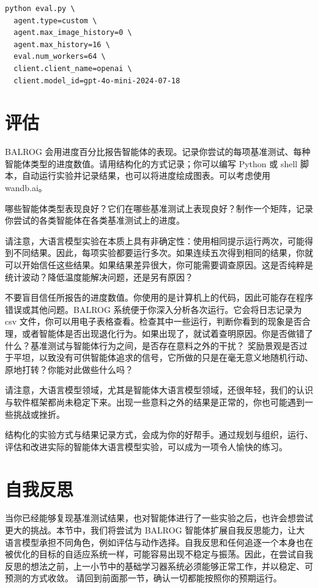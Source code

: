 \begin{listing}
    \begin{verbatim}
python eval.py \
  agent.type=custom \
  agent.max_image_history=0 \
  agent.max_history=16 \
  eval.num_workers=64 \
  client.client_name=openai \
  client.model_id=gpt-4o-mini-2024-07-18        
    \end{verbatim}
    \caption{运行智能体评估。}\label{lst:agent-run}
\end{listing}

\section{评估}
BALROG 会用进度百分比报告智能体的表现。记录你尝试的每项基准测试、每种智能体类型的进度数值。请用结构化的方式记录；你可以编写 Python 或 shell 脚本，自动运行实验并记录结果，也可以将进度绘成图表。可以考虑使用 wandb.ai。

哪些智能体类型表现良好？它们在哪些基准测试上表现良好？制作一个矩阵，记录你尝试的各类智能体在各类基准测试上的进度。

请注意，大语言模型实验在本质上具有非确定性：使用相同提示运行两次，可能得到不同结果。因此，每项实验都要运行多次。如果连续五次得到相同的结果，你就可以开始信任这些结果。如果结果差异很大，你可能需要调查原因。这是否纯粹是统计波动？降低温度能解决问题，还是另有原因？

不要盲目信任所报告的进度数值。你使用的是计算机上的代码，因此可能存在程序错误或其他问题。BALROG 系统便于你深入分析各次运行。它会将日志记录为 csv 文件，你可以用电子表格查看。检查其中一些运行，判断你看到的现象是否合理，或者智能体是否出现退化行为。如果出现了，就试着查明原因。你是否做错了什么？基准测试与智能体行为之间，是否存在意料之外的干扰？
奖励景观是否过于平坦，以致没有可供智能体追求的信号，它所做的只是在毫无意义地随机行动、原地打转？你能对此做些什么吗？

请注意，大语言模型领域，尤其是智能体大语言模型领域，还很年轻，我们的认识与软件框架都尚未稳定下来。出现一些意料之外的结果是正常的，你也可能遇到一些挑战或挫折。

结构化的实验方式与结果记录方式，会成为你的好帮手。通过规划与组织，运行、评估和改进实际的智能体大语言模型实验，可以成为一项令人愉快的练习。

\section{自我反思}
当你已经能够复现基准测试结果，也对智能体进行了一些实验之后，也许会想尝试更大的挑战。本节中，我们将尝试为 BALROG 智能体扩展自我反思能力，让大语言模型承担不同角色，例如评估与动作选择。自我反思和任何追逐一个本身也在被优化的目标的自适应系统一样，可能容易出现不稳定与振荡。因此，在尝试自我反思的想法之前，上一小节中的基础学习器系统必须能够正常工作，并以稳定、可预测的方式收敛。
请回到前面那一节，确认一切都能按照你的预期运行。

